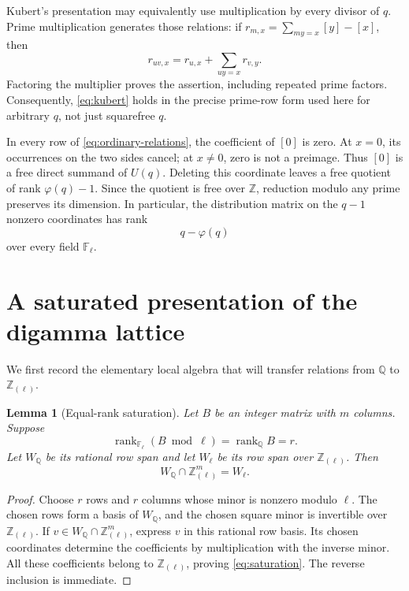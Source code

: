 \documentclass[11pt,a4paper]{article}
\newtheorem{lemma}[theorem]{Lemma}
\theoremstyle{definition}
\theoremstyle{remark}
\newcommand{\Q}{\mathbb Q}
\newcommand{\Z}{\mathbb Z}
\newcommand{\F}{\mathbb F}
\newcommand{\Zloc}{\Z_{(\ell)}}
\DeclareMathOperator{\rank}{rank}
\begin{document}
Kubert's presentation may equivalently use multiplication by every
divisor of $q$. Prime multiplication generates those relations:
if $r_{m,x}=\sum_{my=x}[y]-[x]$, then
\[
 r_{uv,x}=r_{u,x}+\sum_{uy=x}r_{v,y}.
\]
Factoring the multiplier proves the assertion, including repeated
prime factors. Consequently, \eqref{eq:kubert} holds in the precise
prime-row form used here for arbitrary $q$, not just squarefree $q$.

In every row of \eqref{eq:ordinary-relations}, the coefficient of $[0]$
is zero. At $x=0$, its occurrences on the two sides cancel; at $x\ne0$,
zero is not a preimage. Thus $[0]$ is a free direct summand of $U(q)$.
Deleting this coordinate leaves a free quotient of rank $\varphi(q)-1$.
Since the quotient is free over $\Z$, reduction modulo any prime
preserves its dimension. In particular, the distribution matrix on the
$q-1$ nonzero coordinates has rank
\begin{equation}\label{eq:ordinary-rank}
 q-\varphi(q)
\end{equation}
over every field $\F_\ell$.

\section{A saturated presentation of the digamma lattice}

We first record the elementary local algebra that will transfer
relations from $\Q$ to $\Zloc$.

\begin{lemma}[Equal-rank saturation]\label{lem:saturation}
Let $B$ be an integer matrix with $m$ columns. Suppose
\[
 \rank_{\F_\ell}(B\bmod\ell)=\rank_\Q B=r.
\]
Let $W_\Q$ be its rational row span and let $W_{\ell}$ be its row
span over $\Zloc$. Then
\begin{equation}\label{eq:saturation}
 W_\Q\cap\Zloc^m=W_{\ell}.
\end{equation}
\end{lemma}

\begin{proof}
Choose $r$ rows and $r$ columns whose minor is nonzero modulo $\ell$.
The chosen rows form a basis of $W_\Q$, and the chosen square minor
is invertible over $\Zloc$. If $v\in W_\Q\cap\Zloc^m$, express $v$
in this rational row basis. Its chosen coordinates determine the
coefficients by multiplication with the inverse minor. All these
coefficients belong to $\Zloc$, proving \eqref{eq:saturation}.
The reverse inclusion is immediate.
\end{proof}
\end{document}
